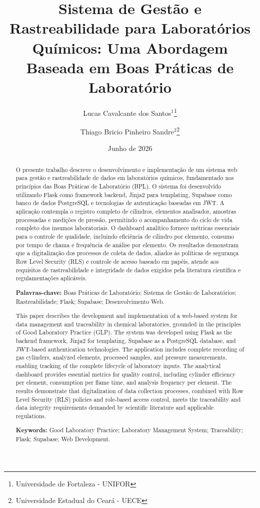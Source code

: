 \documentclass[12pt,a4paper]{article}
\title{Sistema de Gestão e Rastreabilidade para Laboratórios Químicos: Uma Abordagem Baseada em Boas Práticas de Laboratório}
\author{Lucas Cavalcante dos Santos$^{1}$\footnote{Universidade de Fortaleza - UNIFOR} \and 
        Thiago Bricio Pinheiro Sandre$^{2}$\footnote{Universidade Estadual do Ceará - UECE}}
\date{Junho de 2026}
\begin{document}
\maketitle

\begin{abstract}
O presente trabalho descreve o desenvolvimento e implementação de um sistema web para gestão e rastreabilidade de dados em laboratórios químicos, fundamentado nos princípios das Boas Práticas de Laboratório (BPL). O sistema foi desenvolvido utilizando Flask como framework backend, Jinja2 para templating, Supabase como banco de dados PostgreSQL e tecnologias de autenticação baseadas em JWT. A aplicação contempla o registro completo de cilindros, elementos analisados, amostras processadas e medições de pressão, permitindo o acompanhamento do ciclo de vida completo dos insumos laboratoriais. O dashboard analítico fornece métricas essenciais para o controle de qualidade, incluindo eficiência de cilindro por elemento, consumo por tempo de chama e frequência de análise por elemento. Os resultados demonstram que a digitalização dos processos de coleta de dados, aliados às políticas de segurança Row Level Security (RLS) e controle de acesso baseado em papéis, atende aos requisitos de rastreabilidade e integridade de dados exigidos pela literatura científica e regulamentações aplicáveis.

\textbf{Palavras-chave:} Boas Práticas de Laboratório; Sistema de Gestão de Laboratórios; Rastreabilidade; Flask; Supabase; Desenvolvimento Web.
\end{abstract}


\begin{abstract}
This paper describes the development and implementation of a web-based system for data management and traceability in chemical laboratories, grounded in the principles of Good Laboratory Practice (GLP). The system was developed using Flask as the backend framework, Jinja2 for templating, Supabase as a PostgreSQL database, and JWT-based authentication technologies. The application includes complete recording of gas cylinders, analyzed elements, processed samples, and pressure measurements, enabling tracking of the complete lifecycle of laboratory inputs. The analytical dashboard provides essential metrics for quality control, including cylinder efficiency per element, consumption per flame time, and analysis frequency per element. The results demonstrate that digitalization of data collection processes, combined with Row Level Security (RLS) policies and role-based access control, meets the traceability and data integrity requirements demanded by scientific literature and applicable regulations.

\textbf{Keywords:} Good Laboratory Practice; Laboratory Management System; Traceability; Flask; Supabase; Web Development.
\end{abstract}
\end{document}
